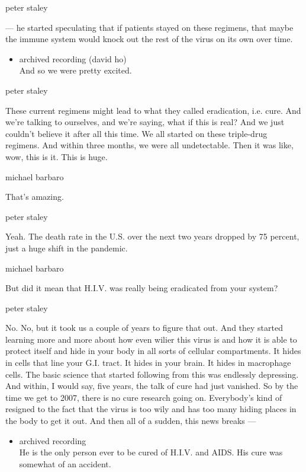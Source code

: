 peter staley

--- he started speculating that if patients stayed on these regimens,
that maybe the immune system would knock out the rest of the virus on
its own over time.

\begin{itemize}
\tightlist
\item
  archived recording (david ho)\\
  And so we were pretty excited.
\end{itemize}

peter staley

These current regimens might lead to what they called eradication, i.e.
cure. And we're talking to ourselves, and we're saying, what if this is
real? And we just couldn't believe it after all this time. We all
started on these triple-drug regimens. And within three months, we were
all undetectable. Then it was like, wow, this is it. This is huge.

michael barbaro

That's amazing.

peter staley

Yeah. The death rate in the U.S. over the next two years dropped by 75
percent, just a huge shift in the pandemic.

michael barbaro

But did it mean that H.I.V. was really being eradicated from your
system?

peter staley

No. No, but it took us a couple of years to figure that out. And they
started learning more and more about how even wilier this virus is and
how it is able to protect itself and hide in your body in all sorts of
cellular compartments. It hides in cells that line your G.I. tract. It
hides in your brain. It hides in macrophage cells. The basic science
that started following from this was endlessly depressing. And within, I
would say, five years, the talk of cure had just vanished. So by the
time we get to 2007, there is no cure research going on. Everybody's
kind of resigned to the fact that the virus is too wily and has too many
hiding places in the body to get it out. And then all of a sudden, this
news breaks ---

\begin{itemize}
\tightlist
\item
  archived recording\\
  He is the only person ever to be cured of H.I.V. and AIDS. His cure
  was somewhat of an accident.
\end{itemize}

